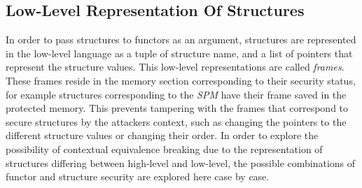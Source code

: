 \documentclass[10pt,a4paper,master=cws, masteroption=ai,english,inputenc=utf8]{kulemt}
\begin{document}
\subsection{Low-Level Representation Of Structures\label{sec:LowLevelRepresentation}}
In order to pass structures to functors as an argument, structures are represented in the low-level language as a tuple of structure name, and a list of pointers that represent the structure values.
This low-level representations are called \emph{frames}.
These frames reside in the memory section corresponding to their security status, for example
structures corresponding to the \emph{SPM} have their frame saved in the protected memory.
This prevents tampering with the frames that correspond to secure structures by the attackers context, such as changing the pointers to the different structure values or changing their order.
In order to explore the possibility of contextual equivalence breaking due to the representation of structures differing between high-level and low-level, the possible combinations of functor and structure security are explored here case by case.
\end{document}
